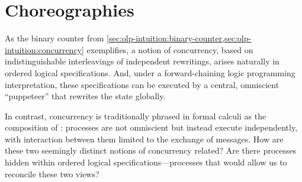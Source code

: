 


% 

% 

\section{Choreographies}\label{sec:choreographies}

As the binary counter from \cref{sec:olp-intuition:binary-counter,sec:olp-intuition:concurrency} exemplifies, a notion of concurrency, based on indistinguishable interleavings of independent rewritings, arises naturally in ordered logical specifications.
And, under a forward-chaining logic programming interpretation, these specifications can be executed by a central, omniscient \enquote{puppeteer} that rewrites the state globally.


In contrast, concurrency is traditionally phrased in formal calculi as the composition of :
processes are not omniscient but instead execute independently, with interaction between them limited to the exchange of messages.
How are these two seemingly distinct notions of concurrency related?
Are there processes hidden within ordered logical specifications---processes that would allow us to reconcile these two views?

